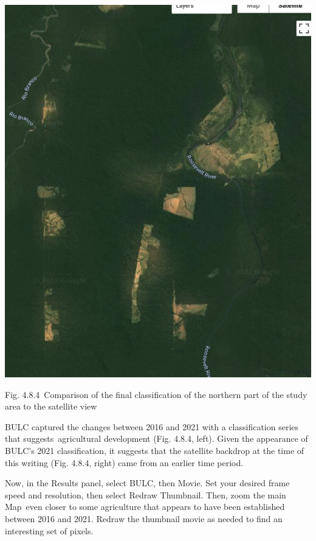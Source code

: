 \documentclass[
  letterpaper,
  DIV=11,
  numbers=noendperiod]{scrreprt}
\begin{document}
\includegraphics{./F4/image10.png}

Fig. 4.8.4~Comparison of the final classification of the northern part
of the study area to the satellite view

BULC captured the changes between 2016 and 2021 with a classification
series that suggests~agricultural development (Fig. 4.8.4, left). Given
the appearance of BULC's 2021 classification, it suggests that the
satellite backdrop at the time of this writing (Fig. 4.8.4, right) came
from an earlier time period.

Now, in the Results panel, select BULC, then Movie. Set your desired
frame speed and resolution, then select Redraw Thumbnail. Then, zoom the
main Map~even closer to some agriculture that appears to have been
established between 2016 and 2021. Redraw the thumbnail movie as needed
to find an interesting set of pixels.
\end{document}
